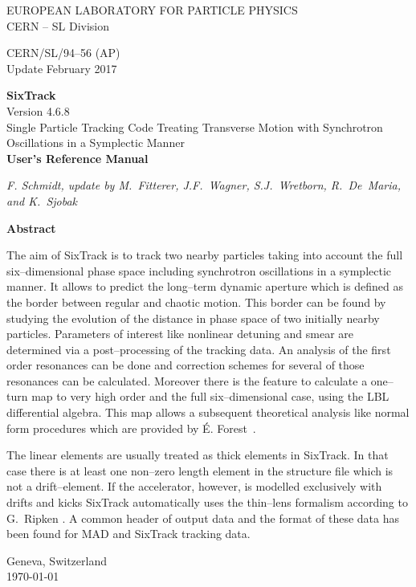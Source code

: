 \documentclass[a4paper,11pt]{report}
\begin{document}

\begin{titlepage}
\begin{center}\normalsize
  EUROPEAN LABORATORY FOR PARTICLE PHYSICS \\
  CERN -- SL Division
\end{center}
\vspace*{2mm}
\begin{flushright}
  CERN/SL/94--56  (AP) \\
  Update February 2017
\end{flushright}
\begin{center}\LARGE
  {\bf SixTrack} \\
  Version 4.6.8 \\
  {Single Particle Tracking Code Treating Transverse Motion with Synchrotron Oscillations in a Symplectic Manner} \\
  \vspace*{2mm} {\bf User's Reference Manual}
\end{center}
\begin{center}\em
  F. Schmidt, update by M.~Fitterer, J.F.~Wagner, S.J.~Wretborn, R.~De~Maria, and K.~Sjobak
\end{center}
\begin{center}\large
  {\bf Abstract} \\
\end{center}
The aim of SixTrack is to track two nearby particles taking into
account the full six--dimensional phase space including synchrotron
oscillations in a symplectic manner. It allows to predict the
long--term dynamic aperture which is defined as the border between
regular and chaotic motion. This border can be found by studying the
evolution of the distance in phase space of two initially nearby
particles.  Parameters of interest like nonlinear detuning and smear
are determined via a post--processing of the tracking data.  An
analysis of the first order resonances can be done and correction
schemes for several of those resonances can be calculated.  Moreover
there is the feature to calculate a one--turn map to very high order
and the full six--dimensional case, using the LBL differential
algebra. This map allows a subsequent theoretical 
analysis like normal form procedures which are provided by \'{E}.
Forest~\cite{DALIE}.

The linear elements are usually treated as thick elements in
SixTrack\@.  In that case there is at least one non--zero length
element in the structure file which is not a drift--element.  If the
accelerator, however, is modelled exclusively with drifts and kicks
SixTrack automatically uses the thin--lens formalism according to
G.~Ripken \cite{Ripken95}. A common header of output
data and the format of these data has been found for MAD and SixTrack
tracking data.

\vfill
\begin{center}
  Geneva, Switzerland \\
  \today
\end{center}

\end{titlepage}
\end{document}
